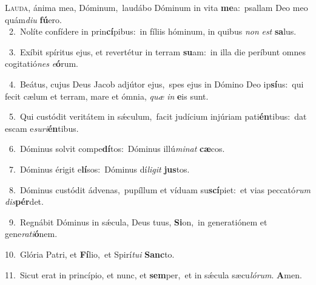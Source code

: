 \lettrine{\initial\textcolor{\initialcolor}{L}}{auda,} ánima mea, Dóminum,~\dagger laudábo Dóminum in vita \textbf{me}\-a:~\star psallam Deo meo quám\-\textit{di}\-\textit{u} \textbf{fú}\-ero.\\
{\numbfont\textcolor{\numbcolor}{~2.}}~Nolíte confídere in prin\-\textbf{cí}\-pibus:~\star in fíliis hóminum, in quibus \textit{non} \textit{est} \textbf{sa}\-lus.\par
{\numbfont\textcolor{\numbcolor}{~3.}}~Exíbit spíritus ejus, et revertétur in terram \textbf{su}\-am:~\star in illa die períbunt omnes cogitatió\textit{nes} \textit{e}\-\textbf{ó}rum.\par
{\numbfont\textcolor{\numbcolor}{~4.}}~Beátus, cujus Deus Jacob adjútor ejus,~\dagger spes ejus in Dómino Deo ip\-\textbf{sí}\-us:~\star qui fecit cælum et terram, mare et ómnia, \textit{quæ} \textit{in} \textbf{e}\-is sunt.\par
{\numbfont\textcolor{\numbcolor}{~5.}}~Qui custódit veritátem in sǽculum,~\dagger facit judícium injúriam pati\-\textbf{én}\-tibus:~\star dat escam e\-\textit{su}\-\textit{ri}\textbf{én}tibus.\par
{\numbfont\textcolor{\numbcolor}{~6.}}~Dóminus solvit compe\-\textbf{dí}\-tos:~\star Dóminus illú\-\textit{mi}\-\textit{nat} \textbf{cæ}\-cos.\par
{\numbfont\textcolor{\numbcolor}{~7.}}~Dóminus érigit e\-\textbf{lí}\-sos:~\star Dóminus dí\-\textit{li}\-\textit{git} \textbf{jus}\-tos.\par
{\numbfont\textcolor{\numbcolor}{~8.}}~Dóminus custódit ádvenas,~\dagger pupíllum et víduam su\-\textbf{scí}\-piet:~\star et vias peccató\textit{rum} \textit{dis}\-\textbf{pér}det.\par
{\numbfont\textcolor{\numbcolor}{~9.}}~Regnábit Dóminus in sǽcula, Deus tuus, \textbf{Si}\-on,~\star in generatiónem et gene\-\textit{ra}\-\textit{ti}\textbf{ó}nem.\par
{\numbfont\textcolor{\numbcolor}{10.}}~Glória Patri, et \textbf{Fí}\-lio,~\star et Spirí\-\textit{tu}\-\textit{i} \textbf{Sanc}\-to.\par
{\numbfont\textcolor{\numbcolor}{11.}}~Sicut erat in princípio, et nunc, et \textbf{sem}\-per,~\star et in sǽcula sæcu\-\textit{ló}\-\textit{rum}. \textbf{A}\-men.\par
